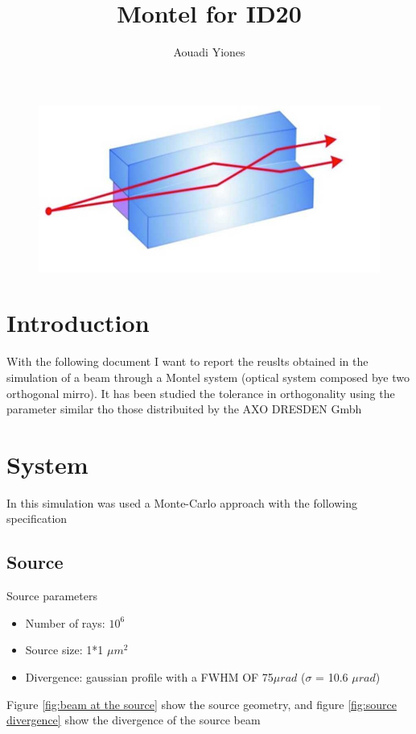 \documentclass[a4paper]{article}
\title{Montel for ID20}
\author{Aouadi Yiones}
\begin{document}
\maketitle


\begin{figure}[H]
\centering
\includegraphics[width=1\textwidth]{Montel.jpg}
\end{figure}

\section{Introduction}
With the following document I want to report the reuslts obtained in the simulation of a beam through a Montel system (optical system composed bye two orthogonal mirro). It has been studied the tolerance in orthogonality using the parameter similar tho those distribuited by the AXO DRESDEN Gmbh \cite{greenwade93}

\section{System}

In this simulation was used a Monte-Carlo approach with the following specification

\subsection{Source}

Source parameters
\begin{itemize}
\item Number of rays: $10^6$
\item Source size: 1*1 $\mu $$m^2$
\item Divergence: gaussian profile with a FWHM OF 75$\mu $$rad$ ($\sigma $ = 10.6 $\mu $$rad$)
\end{itemize}
Figure \ref{fig:beam at the source} show the source geometry, and figure \ref{fig:source divergence} show the divergence of the source beam
\end{document}
